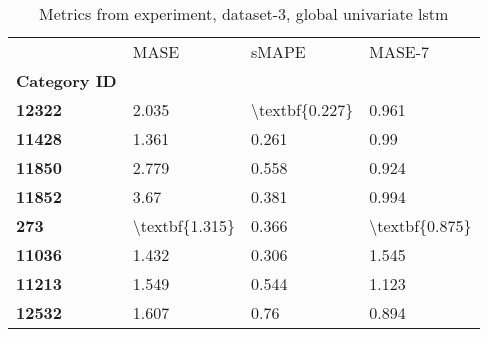 \begin{table}[h]
\centering
\caption{Metrics from experiment, dataset-3, global univariate lstm}
\label{table:global-univariate-lstm-dataset-3}
\begin{tabular}{llll}
\toprule
{} &            MASE &           sMAPE &          MASE-7 \\
\textbf{Category ID} &                 &                 &                 \\
\midrule
\textbf{12322      } &           2.035 &  \textbackslash textbf\{0.227\} &           0.961 \\
\textbf{11428      } &           1.361 &           0.261 &            0.99 \\
\textbf{11850      } &           2.779 &           0.558 &           0.924 \\
\textbf{11852      } &            3.67 &           0.381 &           0.994 \\
\textbf{273        } &  \textbackslash textbf\{1.315\} &           0.366 &  \textbackslash textbf\{0.875\} \\
\textbf{11036      } &           1.432 &           0.306 &           1.545 \\
\textbf{11213      } &           1.549 &           0.544 &           1.123 \\
\textbf{12532      } &           1.607 &            0.76 &           0.894 \\
\bottomrule
\end{tabular}
\end{table}
